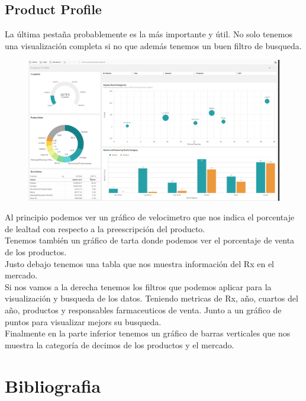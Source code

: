 \documentclass[12pt]{article}
\begin{document}
\clearpage

\subsection{Product Profile}

La última pestaña probablemente es la más importante y útil. No solo tenemos una visualización completa si no que además
tenemos un buen filtro de busqueda.

\begin{figure}[h!]
    \centering
    \includegraphics[width=.8\textwidth]{assets/qlik_3.PNG}
    \label{fig:my_label}
\end{figure}

Al principio podemos ver un gráfico de velocimetro que nos indica el porcentaje de lealtad con respecto a la preescripción del producto.
\\
Tenemos también un gráfico de tarta donde podemos ver el porcentaje de venta de los productos.
\\
Justo debajo tenemos una tabla que nos muestra información del Rx en el mercado.
\\
Si nos vamos a la derecha tenemos los filtros que podemos aplicar para la visualización y busqueda de los datos. Teniendo metricas de Rx,
año, cuartos del año, productos y responsables farmaceuticos de venta. Junto a un gráfico de puntos para visualizar mejors su busqueda.
\\
Finalmente en la parte inferior tenemos un gráfico de barras verticales que nos muestra la categoría de decimos de los productos y 
el mercado.

\clearpage

\section{Bibliografia}

\cite{Cuadro_de_mando}

\printbibliography
\end{document}
